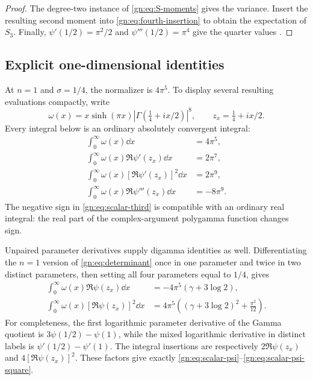 \begin{proof}
The degree-two instance of \eqref{gn:eq:S-moments} gives the variance.
Insert the resulting second moment into
\eqref{gn:eq:fourth-insertion} to obtain the expectation of $S_3$.
Finally, $\psi'(1/2)=\pi^2/2$ and $\psi'''(1/2)=\pi^4$ give the
quarter values \cite{dlmfpolygamma}.
\end{proof}

\subsection{Explicit one-dimensional identities}

At $n=1$ and $\sigma=1/4$, the normalizer is $4\pi^5$.  To display
several resulting evaluations compactly, write
\[
 \omega(x)=x\sinh(\pi x)|\Gamma(\tfrac14+ix/2)|^8,
 \qquad z_x=\tfrac14+ix/2.
\]
Every integral below is an ordinary absolutely convergent integral:
\begin{align}
 \int_0^\infty\omega(x)\dd x&=4\pi^5,
          \label{gn:eq:scalar-normalizer}\\
 \int_0^\infty\omega(x)\Re\psi'(z_x)\dd x&=2\pi^7,
          \label{gn:eq:scalar-trigamma}\\
 \int_0^\infty\omega(x)[\Re\psi'(z_x)]^2\dd x&=2\pi^9,
          \label{gn:eq:scalar-trigamma-square}\\
 \int_0^\infty\omega(x)\Re\psi'''(z_x)\dd x&=-8\pi^9.
          \label{gn:eq:scalar-third}
\end{align}
The negative sign in \eqref{gn:eq:scalar-third} is compatible with an
ordinary real integral: the real part of the complex-argument
polygamma function changes sign.

Unpaired parameter derivatives supply digamma identities as well.
Differentiating the $n=1$ version of
\eqref{gn:eq:determinant} once in one parameter and twice in two
distinct parameters, then setting all four parameters equal to $1/4$,
gives
\begin{align}
 \int_0^\infty\omega(x)\Re\psi(z_x)\dd x
    &=-4\pi^5(\gamma+3\log2),\label{gn:eq:scalar-psi}\\
 \int_0^\infty\omega(x)[\Re\psi(z_x)]^2\dd x
    &=4\pi^5\left((\gamma+3\log2)^2+\frac{\pi^2}{12}\right).
       \label{gn:eq:scalar-psi-square}
\end{align}
For completeness, the first logarithmic parameter derivative of the
Gamma quotient is $3\psi(1/2)-\psi(1)$, while the mixed logarithmic
derivative in distinct labels is $\psi'(1/2)-\psi'(1)$.  The integral
insertions are respectively $2\Re\psi(z_x)$ and
$4[\Re\psi(z_x)]^2$.  These factors give exactly
\eqref{gn:eq:scalar-psi}--\eqref{gn:eq:scalar-psi-square}.

